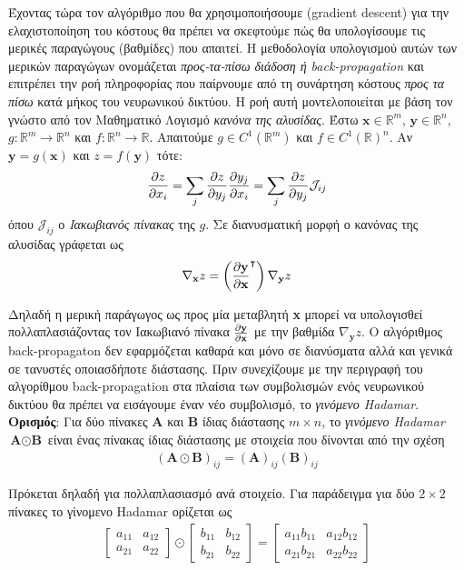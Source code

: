 \documentclass[11pt]{article} %
\numberwithin{equation}{subsection}
\begin{document}
Έχοντας τώρα τον αλγόριθμο που θα χρησιμοποιήσουμε (gradient descent) για την ελαχιστοποίηση του κόστους θα πρέπει να σκεφτούμε πώς θα υπολογίσουμε τις μερικές παραγώγους (βαθμίδες) που απαιτεί. Η μεθοδολογία υπολογισμού αυτών των μερικών παραγώγων ονομάζεται \textit{προς-τα-πίσω διάδοση ή back-propagation} και επιτρέπει την ροή πληροφορίας που παίρνουμε από τη συνάρτηση κόστους \textit{προς τα πίσω} κατά μήκος του νευρωνικού δικτύου. Η ροή αυτή μοντελοποιείται με βάση τον γνώστο από τον Μαθηματικό Λογισμό \textit{κανόνα της αλυσίδας}. Έστω $\textbf{x} \in \mathbb{R}^m$, $\textbf{y} \in \mathbb{R}^n$, $g : \mathbb{R}^m \rightarrow \mathbb{R}^n$ και $f : \mathbb{R}^n \rightarrow \mathbb{R}$. Απαιτούμε $g \in C^1 (\mathbb{R}^m)$ και $f \in C^1 (\mathbb{R})^n$. Αν $\textbf{y} = g(\textbf{x})$ και $z = f(\textbf{y})$ τότε:
\begin{align*}
\displaystyle \pdv{z}{x_i} = \sum_{j} \pdv{z}{y_j} \pdv{y_j}{x_i} =  \sum_{j} \pdv{z}{y_j} \mathcal{J}_{ij}
\end{align*}
όπου $\mathcal{J}_{ij}$ ο \textit{Ιακωβιανός πίνακας} της $g$. Σε διανυσματική μορφή ο κανόνας της αλυσίδας γράφεται ως\\
\begin{align*}
\nabla_{\textbf{x}} z = \left( \pdv{\textbf{y}}{\textbf{x}} ^ \intercal \right) \nabla_{\textbf{y}} z 
\end{align*}

Δηλαδή η μερική παράγωγος ως προς μία μεταβλητή \textbf{x} μπορεί να υπολογισθεί πολλαπλασιάζοντας τον Ιακωβιανό πίνακα $\pdv{\textbf{y}}{\textbf{x}}$ με την βαθμίδα $\nabla_{\textbf{y}} z$. Ο αλγόριθμος back-propagaton δεν εφαρμόζεται καθαρά και μόνο σε διανύσματα αλλά και γενικά σε τανυστές οποιασδήποτε διάστασης. Πριν συνεχίζουμε με την περιγραφή του αλγορίθμου back-propagation στα πλαίσια των συμβολισμών ενός νευρωνικού δικτύου θα πρέπει να εισάγουμε έναν νέο συμβολισμό, το \textit{γινόμενο Hadamar}.\\


\textbf{Ορισμός}: Για δύο πίνακες \textbf{A} και \textbf{B} ίδιας διάστασης $m \times n$, το \textit{γινόμενο Hadamar} $\textbf{A} \odot \textbf{B}$ είναι ένας πίνακας ίδιας διάστασης με στοιχεία που δίνονται από την σχέση
\begin{align*}
(\textbf{A} \odot \textbf{B})_{ij} = (\textbf{A})_{ij} (\textbf{B})_{ij}
\end{align*}

Πρόκεται δηλαδή για πολλαπλασιασμό ανά στοιχείο. Για παράδειγμα για δύο $2 \times 2$ πίνακες το γίνομενο Hadamar ορίζεται ως
\begin{gather}
\begin{bmatrix} a_{11} & a_{12} \\ a_{21} & a_{22}  \end{bmatrix}
\odot
\begin{bmatrix} b_{11} & b_{12} \\ b_{21} & b_{22}  \end{bmatrix}
=
\begin{bmatrix} a_{11} b_{11} & a_{12} b_{12} \\ a_{21} b_{21} & a_{22} b_{22}  \end{bmatrix}
\end{gather}
\end{document}
